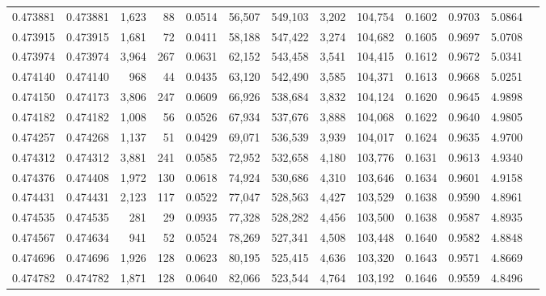 \begin{tabular}{rrrrrrrrrrrrr}
0.473881 & 0.473881 & 1,623 &    88 &                                     0.0514 &  56,507 & 549,103 &   3,202 & 104,754 & 0.1602 & 0.9703 & 5.0864 \\
0.473915 & 0.473915 & 1,681 &    72 &                                     0.0411 &  58,188 & 547,422 &   3,274 & 104,682 & 0.1605 & 0.9697 & 5.0708 \\
0.473974 & 0.473974 & 3,964 &   267 &                                     0.0631 &  62,152 & 543,458 &   3,541 & 104,415 & 0.1612 & 0.9672 & 5.0341 \\
0.474140 & 0.474140 &   968 &    44 &                                     0.0435 &  63,120 & 542,490 &   3,585 & 104,371 & 0.1613 & 0.9668 & 5.0251 \\
0.474150 & 0.474173 & 3,806 &   247 &                                     0.0609 &  66,926 & 538,684 &   3,832 & 104,124 & 0.1620 & 0.9645 & 4.9898 \\
0.474182 & 0.474182 & 1,008 &    56 &                                     0.0526 &  67,934 & 537,676 &   3,888 & 104,068 & 0.1622 & 0.9640 & 4.9805 \\
0.474257 & 0.474268 & 1,137 &    51 &                                     0.0429 &  69,071 & 536,539 &   3,939 & 104,017 & 0.1624 & 0.9635 & 4.9700 \\
0.474312 & 0.474312 & 3,881 &   241 &                                     0.0585 &  72,952 & 532,658 &   4,180 & 103,776 & 0.1631 & 0.9613 & 4.9340 \\
0.474376 & 0.474408 & 1,972 &   130 &                                     0.0618 &  74,924 & 530,686 &   4,310 & 103,646 & 0.1634 & 0.9601 & 4.9158 \\
0.474431 & 0.474431 & 2,123 &   117 &                                     0.0522 &  77,047 & 528,563 &   4,427 & 103,529 & 0.1638 & 0.9590 & 4.8961 \\
0.474535 & 0.474535 &   281 &    29 &                                     0.0935 &  77,328 & 528,282 &   4,456 & 103,500 & 0.1638 & 0.9587 & 4.8935 \\
0.474567 & 0.474634 &   941 &    52 &                                     0.0524 &  78,269 & 527,341 &   4,508 & 103,448 & 0.1640 & 0.9582 & 4.8848 \\
0.474696 & 0.474696 & 1,926 &   128 &                                     0.0623 &  80,195 & 525,415 &   4,636 & 103,320 & 0.1643 & 0.9571 & 4.8669 \\
0.474782 & 0.474782 & 1,871 &   128 &                                     0.0640 &  82,066 & 523,544 &   4,764 & 103,192 & 0.1646 & 0.9559 & 4.8496 \\

\end{tabular}

